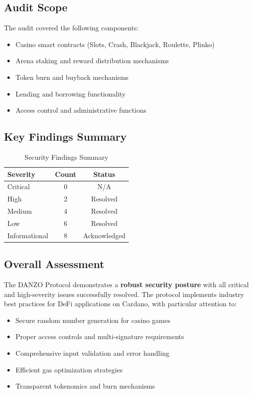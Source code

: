\documentclass[11pt,a4paper]{article}
\begin{document}
\subsection{Audit Scope}
The audit covered the following components:
\begin{itemize}
    \item Casino smart contracts (Slots, Crash, Blackjack, Roulette, Plinko)
    \item Arena staking and reward distribution mechanisms
    \item Token burn and buyback mechanisms
    \item Lending and borrowing functionality
    \item Access control and administrative functions
\end{itemize}

\subsection{Key Findings Summary}
\begin{table}[H]
\centering
\begin{tabular}{@{}lcc@{}}
\toprule
\textbf{Severity} & \textbf{Count} & \textbf{Status} \\
\midrule
Critical & 0 & N/A \\
High & 2 & \textcolor{danzoGreen}{Resolved} \\
Medium & 4 & \textcolor{danzoGreen}{Resolved} \\
Low & 6 & \textcolor{danzoGreen}{Resolved} \\
Informational & 8 & \textcolor{danzoGreen}{Acknowledged} \\
\bottomrule
\end{tabular}
\caption{Security Findings Summary}
\end{table}

\subsection{Overall Assessment}
The DANZO Protocol demonstrates a \textbf{robust security posture} with all critical and high-severity issues successfully resolved. The protocol implements industry best practices for DeFi applications on Cardano, with particular attention to:

\begin{itemize}
    \item Secure random number generation for casino games
    \item Proper access controls and multi-signature requirements
    \item Comprehensive input validation and error handling
    \item Efficient gas optimization strategies
    \item Transparent tokenomics and burn mechanisms
\end{itemize}
\end{document}
